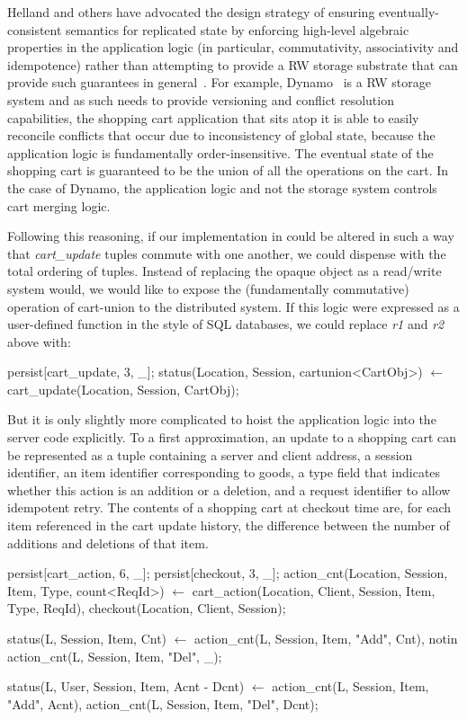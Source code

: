 Helland and others have advocated the design strategy of ensuring eventually-consistent 
semantics for replicated state by enforcing high-level algebraic 
properties in the application logic (in particular, commutativity, associativity and 
idempotence) rather than attempting to provide a RW storage substrate that can provide
such guarantees in general~\cite{quicksand, beyond}.  For example, Dynamo~\cite{dynamo} 
is a RW storage system
and as such needs to provide versioning and conflict resolution capabilities, the shopping
cart application that sits atop it is able to easily reconcile conflicts that occur due to inconsistency of global state, because the application logic is fundamentally order-insensitive.
The eventual state of the shopping cart is guaranteed to be the union of all the operations on
the cart.  In the case of Dynamo, the application logic and not the storage system controls
cart merging logic.

Following this reasoning, if our implementation in \lang could be altered in such a way that
{\em cart\_update} tuples commute with one another,  we could dispense with the total
ordering of tuples.  Instead of replacing the opaque object as a read/write system would,
we would like to expose the (fundamentally commutative) operation of cart-union to the distributed
system.  If this logic were expressed as a user-defined function in the style of SQL databases,
we could replace {\em r1} and {\em r2} above with:

\begin{Dedalus}
persist[cart_update, 3, _];
status(Location, Session, cartunion<CartObj>) \(\leftarrow\)
    cart_update(Location, Session, CartObj);
\end{Dedalus}

But it is only slightly more complicated to hoist the application logic into
the server code explicitly.  To a first approximation, an update to a shopping cart
can be represented as a tuple containing a server and client address, a session identifier,
an item identifier corresponding to goods, a type field that indicates whether this action
is an addition or a deletion, and a request identifier to allow idempotent retry.  The contents
of a shopping cart at checkout time are, for each item referenced in the cart update history, 
the difference between the number of additions and deletions of that item.

\begin{Dedalus}
persist[cart_action, 6, _];
persist[checkout, 3, _];
action_cnt(Location, Session, Item, Type, count<ReqId>) \(\leftarrow\)
    cart_action(Location, Client, Session, Item, Type, ReqId),
    checkout(Location, Client, Session);

status(L, Session, Item, Cnt) \(\leftarrow\)
    action_cnt(L, Session, Item, "Add", Cnt),
    notin action_cnt(L, Session, Item, "Del", _);

status(L, User, Session, Item, Acnt - Dcnt) \(\leftarrow\)
    action_cnt(L, Session, Item, "Add", Acnt),
    action_cnt(L, Session, Item, "Del", Dcnt);
\end{Dedalus}


